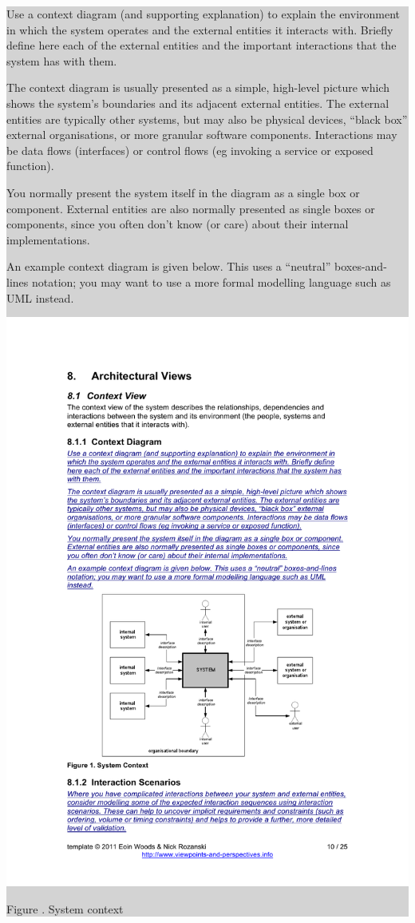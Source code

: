 \documentclass[a4paper,11pt]{report}
\newcommand{\instructions}[1]{
  \noindent\colorbox{lightgray}{%
    \parbox{\linewidth}{%
      #1
    }%
  }%
 \vspace{0.1cm}
}
\newcommand{\mycaption}[1]{
  \addtocounter{figures}{1}
  Figure \arabic{figures}. #1
}
\begin{document}
\instructions{
Use a context diagram (and supporting explanation) to explain the
environment in which the system operates and the external entities it
interacts with. Briefly define here each of the external entities and
the important interactions that the system has with them.

The context diagram is usually presented as a simple, high-level
picture which shows the system’s boundaries and its adjacent external
entities. The external entities are typically other systems, but may
also be physical devices, “black box” external organisations, or more
granular software components. Interactions may be data flows
(interfaces) or control flows (eg invoking a service or exposed
function).

You normally present the system itself in the diagram as a single box
or component. External entities are also normally presented as single
boxes or components, since you often don’t know (or care) about their
internal implementations.

An example context diagram is given below. This uses a “neutral”
boxes-and-lines notation; you may want to use a more formal modelling
language such as UML instead.

\begin{center}
  \includegraphics[width=\textwidth]{figures/systemcontext}\\
  \mycaption{System context}
\end{center}

}
\end{document}
